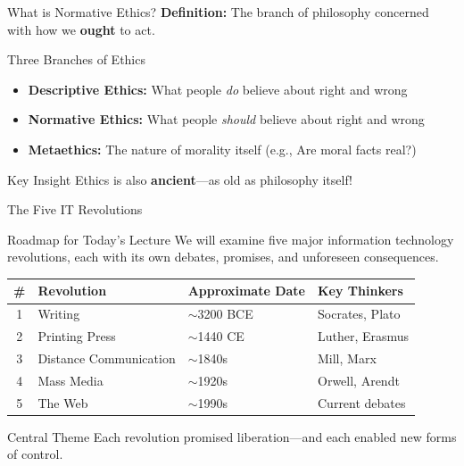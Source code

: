 \documentclass[aspectratio=169]{beamer}
\begin{document}
\begin{frame}{What is Normative Ethics?}
\textbf{Definition:} The branch of philosophy concerned with how we \textbf{ought} to act.

\vspace{0.5em}
\begin{block}{Three Branches of Ethics}
\begin{itemize}
  \item \textbf{Descriptive Ethics:} What people \textit{do} believe about right and wrong
  \item \textbf{Normative Ethics:} What people \textit{should} believe about right and wrong
  \item \textbf{Metaethics:} The nature of morality itself (e.g., Are moral facts real?)
\end{itemize}
\end{block}

\vspace{0.3em}
\begin{alertblock}{Key Insight}
Ethics is also \textbf{ancient}---as old as philosophy itself!
\end{alertblock}

\vspace{0.3em}
\end{frame}

\begin{frame}{The Five IT Revolutions}
\begin{block}{Roadmap for Today's Lecture}
We will examine five major information technology revolutions, each with its own debates, promises, and unforeseen consequences.
\end{block}

\vspace{0.3em}
\begin{table}
\centering
\small
\begin{tabular}{@{}clll@{}}
\toprule
\textbf{\#} & \textbf{Revolution} & \textbf{Approximate Date} & \textbf{Key Thinkers} \\
\midrule
1 & Writing & $\sim$3200 BCE & Socrates, Plato \\
2 & Printing Press & $\sim$1440 CE & Luther, Erasmus \\
3 & Distance Communication & $\sim$1840s & Mill, Marx \\
4 & Mass Media & $\sim$1920s & Orwell, Arendt \\
5 & The Web & $\sim$1990s & Current debates \\
\bottomrule
\end{tabular}
\end{table}

\vspace{0.3em}
\begin{exampleblock}{Central Theme}
Each revolution promised liberation---and each enabled new forms of control.
\end{exampleblock}
\end{frame}
\end{document}
